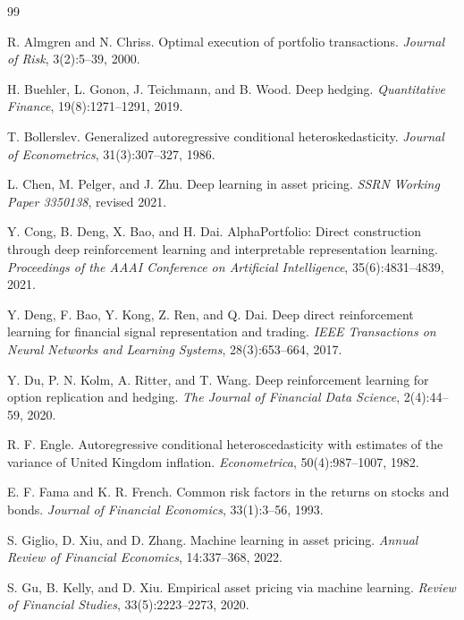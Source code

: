 \documentclass[11pt]{article}
\begin{document}
\begin{thebibliography}{99}

R. Almgren and N. Chriss.
\newblock Optimal execution of portfolio transactions.
\newblock \emph{Journal of Risk}, 3(2):5--39, 2000.

H. Buehler, L. Gonon, J. Teichmann, and B. Wood.
\newblock Deep hedging.
\newblock \emph{Quantitative Finance}, 19(8):1271--1291, 2019.

T. Bollerslev.
\newblock Generalized autoregressive conditional heteroskedasticity.
\newblock \emph{Journal of Econometrics}, 31(3):307--327, 1986.

L. Chen, M. Pelger, and J. Zhu.
\newblock Deep learning in asset pricing.
\newblock \emph{SSRN Working Paper 3350138}, revised 2021.

Y. Cong, B. Deng, X. Bao, and H. Dai.
\newblock AlphaPortfolio: Direct construction through deep reinforcement learning
  and interpretable representation learning.
\newblock \emph{Proceedings of the AAAI Conference on Artificial Intelligence},
  35(6):4831--4839, 2021.

Y. Deng, F. Bao, Y. Kong, Z. Ren, and Q. Dai.
\newblock Deep direct reinforcement learning for financial signal representation
  and trading.
\newblock \emph{IEEE Transactions on Neural Networks and Learning Systems},
  28(3):653--664, 2017.

Y. Du, P. N. Kolm, A. Ritter, and T. Wang.
\newblock Deep reinforcement learning for option replication and hedging.
\newblock \emph{The Journal of Financial Data Science}, 2(4):44--59, 2020.

R. F. Engle.
\newblock Autoregressive conditional heteroscedasticity with estimates of the
  variance of United Kingdom inflation.
\newblock \emph{Econometrica}, 50(4):987--1007, 1982.


E. F. Fama and K. R. French.
\newblock Common risk factors in the returns on stocks and bonds.
\newblock \emph{Journal of Financial Economics}, 33(1):3--56, 1993.

S. Giglio, D. Xiu, and D. Zhang.
\newblock Machine learning in asset pricing.
\newblock \emph{Annual Review of Financial Economics}, 14:337--368, 2022.

S. Gu, B. Kelly, and D. Xiu.
\newblock Empirical asset pricing via machine learning.
\newblock \emph{Review of Financial Studies}, 33(5):2223--2273, 2020.


\end{thebibliography}
\end{document}
